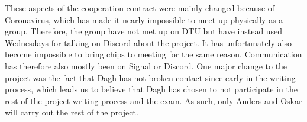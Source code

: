 \documentclass[11pt, fleqn]{article}
\begin{document}
	These aspects of the cooperation contract were mainly changed because of Coronavirus, which has made it nearly impossible to meet up physically as a group. Therefore, the group have not met up on DTU but have instead used Wednesdays for talking on Discord about the project. It has unfortunately also become impossible to bring chips to meeting for the same reason. Communication has therefore also mostly been on Signal or Discord. One major change to the project was the fact that Dagh has not broken contact since early in the writing process, which leads us to believe that Dagh has chosen to not participate in the rest of the project writing process and the exam. As such, only Anders and Oskar will carry out the rest of the project.
	
\end{document}
